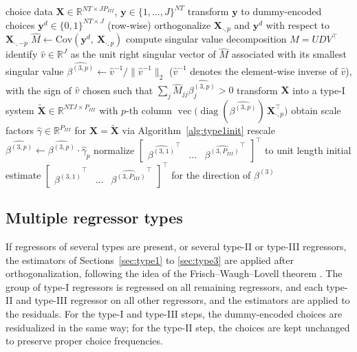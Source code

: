 \documentclass[preprint,12pt,authoryear]{elsarticle}
\newcommand{\R}{\mathbb{R}}
\newcommand{\Cov}{\text{Cov}}
\newcommand{\norm}[1]{\ensuremath{\lVert #1\rVert_2}}
\begin{document}
\begin{algorithm}[htbp]
  \caption{Initial estimates for type-III coefficients.}
  \label{alg:type3init}
  \begin{algorithmic}[1]
    \REQUIRE choice data $\bm{X} \in \R^{NT \times JP_{III}}$, $\bm{y} \in \{1,\dots,J\}^{NT}$
    \STATE transform $\bm{y}$ to dummy-encoded choices $\bm{y}^d \in \{0,1\}^{NT \times J}$ (row-wise)
        \STATE orthogonalize $\bm{X}_{\cdot, p}$ and $\bm{y}^d$ with respect to $\bm{X}_{\cdot, -p}$
        \ENDIF
        \STATE $\widehat{M} \leftarrow \Cov(\bm{y}^d,\ \bm{X}_{\cdot, p})$
        \STATE compute singular value decomposition $\widehat{M} = UDV^\top$
        \STATE identify $\hat v \in \R^J$ as the unit right singular vector of $\widehat{M}$ associated with its smallest singular value
        \STATE $\widehat{\beta^{(3,p)}} \leftarrow \hat v^{-1} / \norm{\hat v^{-1}}$ ($\hat v^{-1}$ denotes the element-wise inverse of $\hat v$), with the sign of $\hat v$ chosen such that $\sum_j \widehat{M}_{jj} \widehat{\beta^{(3,p)}_j} > 0$
      \ENDFOR
      \STATE transform $\bm{X}$ into a type-I system $\tilde{\bm{X}} \in \R^{NTJ \times P_{III}}$ with $p$-th column $\operatorname{vec}\bigl(\operatorname{diag}(\widehat{\beta^{(3,p)}})\, \bm{X}_{\cdot,p}^\top\bigr)$
    \STATE obtain scale factors $\hat{\gamma} \in \R^{P_{III}}$ for $\bm{X} = \tilde{\bm{X}}$ via Algorithm~\ref{alg:type1init}
      \STATE rescale $\widehat{\beta^{(3,p)}} \leftarrow \widehat{\beta^{(3,p)}} \cdot \hat{\gamma}_p$
    \ENDFOR
    \ENDIF
    \STATE normalize $\begin{bmatrix} {\widehat{\beta^{(3,1)}}}^\top & \dots & {\widehat{\beta^{(3,P_{III})}}}^\top \end{bmatrix}^\top$ to unit length
    \ENSURE initial estimate $\begin{bmatrix} {\widehat{\beta^{(3,1)}}}^\top & \dots & {\widehat{\beta^{(3,P_{III})}}}^\top \end{bmatrix}^\top$ for the direction of $\beta^{(3)}$
  \end{algorithmic}
\end{algorithm}

\subsection{Multiple regressor types}\label{sec:mixed}

If regressors of several types are present, or several type-II or type-III regressors, the estimators of Sections~\ref{sec:type1} to \ref{sec:type3} are applied after orthogonalization, following the idea of the Frisch--Waugh--Lovell theorem \citep{Frisch1933}. The group of type-I regressors is regressed on all remaining regressors, and each type-II and type-III regressor on all other regressors, and the estimators are applied to the residuals. For the type-I and type-III steps, the dummy-encoded choices are residualized in the same way; for the type-II step, the choices are kept unchanged to preserve proper choice frequencies.
\end{document}
